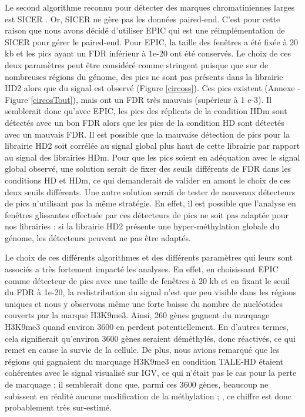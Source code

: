 \documentclass[a4paper,12pt,times]{report}
\begin{document}
\bigskip
Le second algorithme reconnu pour détecter des marques chromatiniennes larges est SICER \cite{SICER}. Or, SICER ne gère pas les données paired-end.  C'est pour cette raison que nous avons décidé d'utiliser EPIC  \cite{SICER} qui est une réimplémentation de SICER pour gérer le paired-end. Pour EPIC, la taille des fenêtres a été fixée à 20 kb et les pics ayant un FDR inférieur à 1e-20 ont été conservés.
\newline
Le choix de ces deux paramètres peut être considéré comme stringent puisque que sur de nombreuses régions du génome, des pics ne sont pas présents dans la librairie HD2 alors que du signal est observé (Figure \ref{circoss}). Ces pics existent (Annexe - Figure \ref{circosTout}), mais ont un FDR très mauvais (supérieur à 1 e-3).  Il semblerait donc qu'avec EPIC, les pics des réplicats de la condition HDm sont détectés avec un bon FDR alors que les pics de la condition HD sont détectés avec un mauvais FDR.
 \newline
Il est possible que la mauvaise détection de pics pour la librairie HD2 soit corrélée au signal global plus haut de cette librairie par rapport au signal des librairies HDm.
Pour que les pics soient en adéquation avec le signal global observé, une solution serait de fixer des seuils différents de FDR dans les conditions HD et HDm, ce qui demanderait de valider en amont le choix de ces deux seuils différents.
\newline Une autre solution serait de tester de nouveaux détecteurs de pics n'utilisant pas la même stratégie.
En effet, il est possible que l'analyse en fenêtres glissantes effectuée par ces détecteurs de pics ne soit pas adaptée pour nos librairies : si la librairie HD2 présente une hyper-méthylation globale du génome, les détecteurs peuvent ne pas être adaptés. 

\bigskip
Le choix de ces différents algorithmes et des différents paramètres qui leurs sont associés a très fortement impacté les analyses. En effet,  en choisissant EPIC comme détecteur de pics avec une taille de fenêtres à 20 kb  et en fixant le seuil du FDR à 1e-20, la redistribution du signal n'est que peu visible dans les régions uniques et nous y observons même une forte baisse du nombre de nucléotides couverts par la marque H3K9me3. Ainsi, 260 gènes gagnent du marquage H3K9me3 quand environ 3600 en perdent potentiellement. En d'autres termes, cela signifierait qu'environ 3600 gènes seraient déméthylés, donc réactivés, ce qui remet en cause la survie de la cellule.
De plus, nous avions remarqué que les régions qui gagnaient du marquage H3K9me3 en condition TALE-HD étaient cohérentes avec le signal visualisé sur IGV, ce qui n'était pas le cas pour la perte de marquage : il semblerait donc que, parmi ces 3600 gènes, beaucoup ne subissent en réalité aucune modification de la méthylation ; , ce chiffre est donc probablement très sur-estimé.
\end{document}
